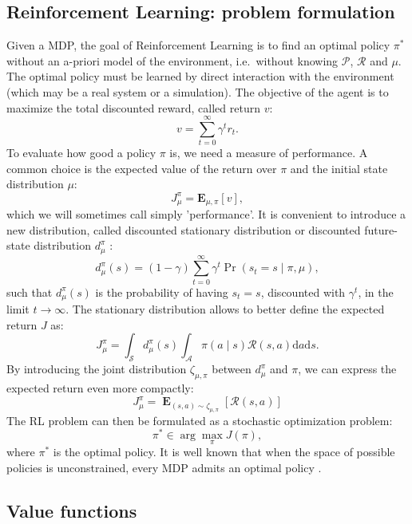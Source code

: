 \subsection{Reinforcement Learning: problem formulation}
Given a \ac{MDP}, the goal of Reinforcement Learning is to find an optimal policy $\pi^*$ without an a-priori model of the environment, i.e.\ without knowing $\mathcal{P}$, $\mathcal{R}$ and $\mu$. The optimal policy must be learned by direct interaction with the environment (which may be a real system or a simulation). The objective of the agent is to maximize the total discounted reward, called return $v$:
\[
	v = \sum_{t=0}^{\infty}\gamma^tr_{t}.
\]
To evaluate how good a policy $\pi$ is, we need a measure of performance. A common choice is the expected value of the return over $\pi$ and the initial state distribution $\mu$:
\[
	J_\mu^\pi = \mathbf{E}_{\mu,\pi}[v],
\]
which we will sometimes call simply 'performance'.
It is convenient to introduce a new distribution, called discounted stationary distribution or discounted future-state distribution $d_{\mu}^{\pi}$ \cite{Sutton1999a}:
\[
	d_{\mu}^{\pi}(s) = (1-\gamma)\sum_{t=0}^{\infty}\gamma^t\Pr(s_t=s\mid\pi,\mu),
\] 
such that $d_{\mu}^{\pi}(s)$ is the probability of having $s_t = s$, discounted with $\gamma^t$, in the limit $t\to\infty$.  
The stationary distribution allows to better define the expected return $J$ as:
\[
	J_\mu^\pi = \int_{\mathcal{S}}d_{\mu}^{\pi}(s)\int_{\mathcal{A}}\pi(a \mid s)\mathcal{R}(s,a)\mathrm{d}a\mathrm{d}s.
\]
By introducing the joint distribution $\zeta_{\mu,\pi}$ between $d_{\mu}^{\pi}$ and $\pi$, we can express the expected return even more compactly:
\[
	J_\mu^\pi = \mathop{\mathbf{E}}_{(s,a)\sim\zeta_{\mu,\pi}}\left[\mathcal{R}(s,a)\right]
\]
The \ac{RL} problem can then be formulated as a stochastic optimization problem:
\[
	\pi^* \in \arg\max\limits_{\pi}J(\pi),
\]
where $\pi^*$ is the optimal policy. It is well known that when the space of possible policies is unconstrained, every \ac{MDP} admits an optimal policy \cite{Weiss667}.

\subsection{Value functions}
